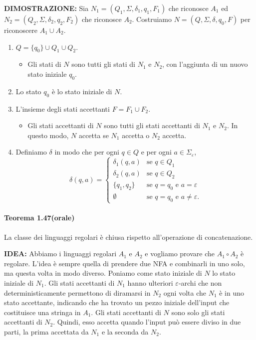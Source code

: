 \documentclass{article}
\begin{document}
\textbf{DIMOSTRAZIONE:}
Sia $N_1 = (Q_1, \Sigma, \delta_1, q_1, F_1)$ che riconosce $A_1$ ed
$N_2 = (Q_2, \Sigma, \delta_2, q_2, F_2)$ che riconosce $A_2$.
Costruiamo $N = (Q, \Sigma, \delta, q_0, F)$ per riconoscere $A_1 \cup A_2$.
\begin{enumerate}
    \item $Q = \{q_0\} \cup Q_1 \cup Q_2.$
        \begin{itemize}
            \item Gli stati di $N$ sono tutti gli stati di $N_1$ e $N_2$, con l'aggiunta di un nuovo stato iniziale $q_0$.
        \end{itemize}
    \item Lo stato $q_0$ è lo stato iniziale di $N$.
    \item L'insieme degli stati accettanti $F = F_1 \cup F_2$.
        \begin{itemize}
            \item Gli stati accettanti di $N$ sono tutti gli stati accettanti di $N_1$ e $N_2$. In questo modo, $N$ accetta se $N_1$ accetta o $N_2$ accetta.
        \end{itemize}
    \item Definiamo $\delta$ in modo che per ogni $q \in Q$ e per ogni $a \in \Sigma_\varepsilon$,
    \[
    \delta(q, a) =
    \begin{cases}
        \delta_1(q, a) & \text{se } q \in Q_1 \\
        \delta_2(q, a) & \text{se } q \in Q_2 \\
        \{q_1, q_2\} & \text{se } q = q_0 \text{ e } a = \varepsilon \\
        \emptyset & \text{se } q = q_0 \text{ e } a \neq \varepsilon.
    \end{cases}
    \]
\end{enumerate}

\paragraph{Teorema 1.47(orale)}
\text{  }
\begin{tcolorbox}[colback=green!10!white, colframe=green!50!black, title=Teorema 1.47 (orale)]
    La  classe dei linguaggi regolari è chiusa rispetto all'operazione di concatenazione.
\end{tcolorbox}

\textbf{IDEA:}
Abbiamo i linguaggi regolari $A_{1}$ e $A_{2}$ e vogliamo provare che $A_{1}\circ A_{2}$ è regolare.
L'idea è sempre quella di prendere due NFA e combinarli in uno solo, ma questa volta in modo diverso. Poniamo come stato iniziale di $N$ lo stato iniziale di $N_{1}$. Gli stati accettanti di $N_{1}$ hanno ulteriori $\varepsilon$-archi che non deterministicamente permettono di diramarsi in $N_{2}$ ogni volta che $N_{1}$ è in uno stato accettante, indicando che ha trovato un pezzo iniziale dell'input che costituisce una stringa in $A_{1}$. Gli stati accettanti di $N$ sono solo gli stati accettanti di $N_{2}$. Quindi, esso accetta quando l'input può essere diviso in due parti, la prima accettata da $N_{1}$ e la seconda da $N_{2}$.
\end{document}
